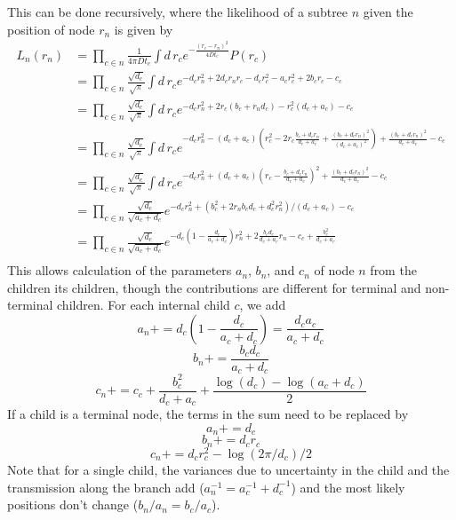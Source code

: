 \documentclass[aps,rmp, onecolumn]{revtex4}
\begin{document}
This can be done recursively, where the likelihood of a subtree $n$ given the position of node $r_n$ is given by
\begin{equation}
    \begin{split}
        L_n(r_n) & = \prod_{c\in n}\frac{1}{4\pi D t_c}\int  d\, r_c e^{- \frac{(r_c - r_n)^2}{4Dt_c}}P(r_c) \\
        & = \prod_{c\in n} \frac{\sqrt{d_c}}{\sqrt{\pi}}\int d\, r_c e^{- d_c r_n^2 + 2d_c r_n r_c - d_c r_c^2 - a_c r_c^2 + 2 b_c r_c - c_c} \\
        & = \prod_{c\in n} \frac{\sqrt{d_c}}{\sqrt{\pi}}\int d\, r_c e^{- d_c r_n^2 + 2r_c(b_c + r_n d_c) - r_c^2 \left(d_c + a_c\right) - c_c} \\
        & = \prod_{c\in n} \frac{\sqrt{d_c}}{\sqrt{\pi}}\int d\, r_c e^{- d_c r_n^2 - (d_c + a_c)(r_c^2 - 2r_c\frac{b_c + d_c r_n}{d_c + a_c} + \frac{(b_c + d_c r_n)^2}{(d_c + a_c)^2}) + \frac{(b_c + d_c r_n)^2}{d_c + a_c} - c_c} \\
        & = \prod_{c\in n} \frac{\sqrt{d_c}}{\sqrt{\pi}}\int d\, r_c e^{- d_c r_n^2 + (d_c + a_c)(r_c - \frac{b_c + d_c r_n}{d_c + a_c})^2 + \frac{(b_c + d_c r_n)^2}{d_c + a_c} - c_c} \\
        & = \prod_{c\in n}\frac{\sqrt{d_c}}{\sqrt{a_c + d_c}} e^{- d_c r_n^2 + (b_c^2 + 2r_n b_c d_c + d_c^2 r_n^2 )/\left(d_c + a_c\right) - c_c} \\
        & = \prod_{c\in n}\frac{\sqrt{d_c}}{\sqrt{a_c + d_c}} e^{- d_c\left(1 - \frac{d_c}{a_c+d_c}\right) r_n^2 +  2\frac{b_c d_c}{d_c+a_c} r_n  - c_c + \frac{b_c^2}{d_c + a_c}} \\
    \end{split}
\end{equation}
This allows calculation of the parameters $a_n$, $b_n$, and $c_n$ of node $n$ from the children its children, though the contributions are different for terminal and non-terminal children. 
For each internal child $c$, we add
\begin{equation}
    a_n += d_c \left(1-\frac{d_c}{a_c+d_c}\right) = \frac{d_c a_c}{a_c+d_c}
\end{equation}
\begin{equation}
    b_n += \frac{b_c d_c}{a_c + d_c}
\end{equation}
\begin{equation}
    c_n += c_c  + \frac{b_c^2}{d_c + a_c} + \frac{\log(d_c) - \log(a_c+d_c)}{2}
\end{equation}
If a child is a terminal node, the terms in the sum need to be replaced by
\begin{equation}
    a_n +=  d_c
\end{equation}
\begin{equation}
    b_n += d_c r_c
\end{equation}
\begin{equation}
    c_n += d_c r_c^2 - \log(2\pi/d_c)/2
\end{equation}
Note that for a single child, the variances due to uncertainty in the child and the transmission along the branch add ($a_n^{-1} = a_c^{-1} + d_c^{-1}$) and the most likely positions don't change ($b_n/a_n = b_c/a_c$).
\end{document}
